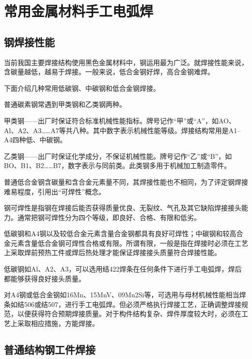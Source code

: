 \documentclass{ctexbook}
\begin{document}
\section{常用金属材料手工电弧焊}
\subsection{钢焊接性能}
当前我国主要焊接结构使用黑色金属材料中，钢运用最为广泛。就焊接性能来说，含碳量越低，越易于焊接。一般来说，低合金钢好焊，高合金钢难焊。

下面介绍几种常用低碳钢、中碳钢和低合金钢焊接。

普通碳素钢常遇到甲类钢和乙类钢两种。

甲类钢——出厂时保证符合标准机械性能指标。牌号记作“甲”或“A”，如AO、Al、A2、A3……A7等共八种。其中数字表示机械性能等级。焊接结构常用是A1--A4四种低、中碳钢。

乙类钢——出厂时保证化学成分，不保证机械性能。牌号记作“乙”或“B”，如BO、B1、B2……B7，数字表示与同前类。此类钢多用于机械加工制造零件。

普通低合金钢含碳量和含合金元素量不同，其焊接性能也不相同，为了评定钢焊接难易程度，引用出“可焊性”概念。

钢可焊性是指钢在焊接后能否获得质量优良、无裂纹、气孔及其它缺陷焊接接头能力。通常把钢可焊性分为四个等级，即良好、合格、有限和低劣。

低碳钢和A4钢以及较低合金元素含量合金钢都具有良好可焊性；中碳钢和较高合金元素含量低合金钢可焊性合格或有限。所谓有限，一般是指在焊接时必须在工艺上采取焊前预热工件或焊后热处理才能保证焊接接头质量符合焊接性能。

低碳钢如Al、A2、A3，可以选用结422焊条在任何条件下进行手工电弧焊，焊后都能够获得良好接头质量。

对A4钢或低合金钢如16Mn、15MnV、09Mn2Si等，可选用与母材机械性能相当焊条如结506或结507，进行手工电弧焊。但必须严格执行焊接工艺，正确调整焊接规范，以便获得符合预期焊接质量。对于构件结构复杂、焊件厚度较大时，必须在工艺上采取相应措施，方能焊接。
\subsection{普通结构钢工件焊接}
\end{document}
